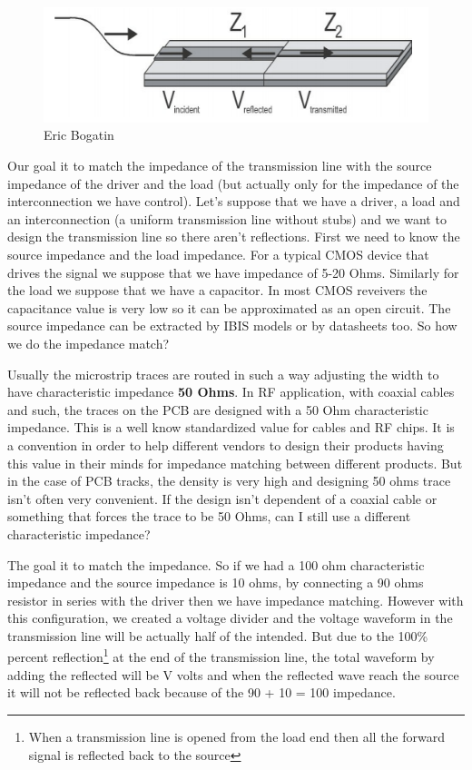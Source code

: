 \documentclass[12pt]{article}
\begin{document}
\begin{figure}[h!]
	\centering
	\includegraphics[width = \textwidth, keepaspectratio, height=.3\textheight]{assets/impedance_matching.png}
	\caption{Eric Bogatin}
\end{figure}

Our goal it to match the impedance of the transmission line with the source impedance of the driver and the load (but actually only for the impedance of the interconnection we have control). Let's suppose that we have a driver, a load and an interconnection (a uniform transmission line without stubs) and we want to design the transmission line so there aren't reflections. First we need to know the source impedance and the load impedance. For a typical CMOS device that drives the signal we suppose that we have impedance of 5-20 Ohms. Similarly for the load we suppose that we have a capacitor. In most CMOS reveivers the capacitance value is very low so it can be approximated as an open circuit. The source impedance can be extracted by IBIS models or by datasheets too. So how we do the impedance match? 

Usually the microstrip traces are routed in such a way adjusting the width to have characteristic impedance \textbf{50 Ohms}. In RF application, with coaxial cables and such, the traces on the PCB are designed with a 50 Ohm characteristic impedance. This is a well know standardized value for cables and RF chips. It is a convention in order to help different vendors to design their products having this value in their minds for impedance matching between different products. But in the case of PCB tracks, the density is very high and designing 50 ohms trace isn't often very convenient. If the design isn't dependent of a coaxial cable or something that forces the trace to be 50 Ohms, can I still use a different characteristic impedance?
 
The goal it to match the impedance. So if we had a 100 ohm characteristic impedance and the source impedance is 10 ohms, by connecting a 90 ohms resistor in series with the driver then we have impedance matching. However with this configuration, we created a voltage divider and the voltage waveform in the transmission line will be actually half of the intended. But due to the 100\% percent reflection\footnote{When a transmission line is opened from the load end then all the forward signal is reflected back to the source} at the end of the transmission line, the total waveform by adding the reflected will be V volts and when the reflected wave reach the source it will not be reflected back because of the 90 + 10 = 100 impedance.
\end{document}
